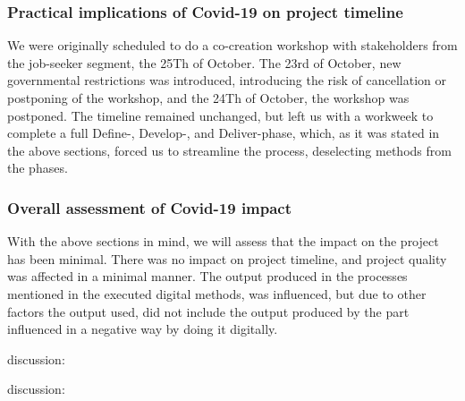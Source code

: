 \subsubsection{Practical implications of Covid-19 on project timeline}

We were originally scheduled to do a co-creation workshop with stakeholders from the job-seeker segment, the 25Th of October. The 23rd of October, new governmental restrictions was introduced, introducing the risk of cancellation or postponing of the workshop, and the 24Th of October, the workshop was postponed. The timeline remained unchanged, but left us with a workweek to complete a full Define-, Develop-, and Deliver-phase, which, as it was stated in the above sections, forced us to streamline the process, deselecting methods from the phases. 

\subsubsection{Overall assessment of Covid-19 impact}

With the above sections in mind, we will assess that the impact on the project has been minimal. There was no impact on project timeline, and project quality was affected in a minimal manner. The output produced in the processes mentioned in the executed digital methods, was influenced, but due to other factors the output used, did not include the output produced by the part influenced in a negative way by doing it digitally. 

discussion: 

discussion: 
